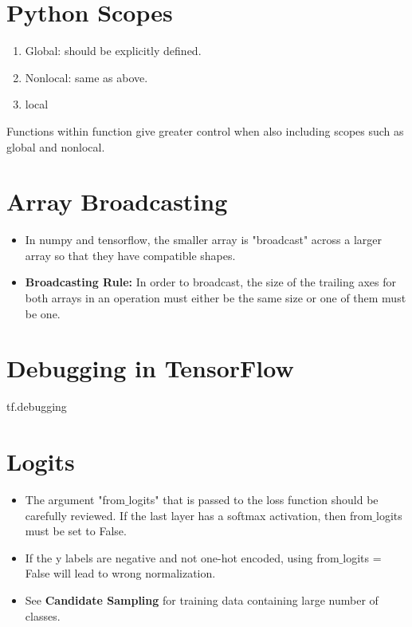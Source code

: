 \documentclass[11pt]{article}
\begin{document}
\begin{multicols*}{2}
\section{Python Scopes}
\begin{enumerate}
\item Global: should be explicitly defined.
\item Nonlocal: same as above.
\item local

\end{enumerate}

Functions within function give greater control when also including scopes such as global and nonlocal.

\section{Array Broadcasting}
\begin{itemize}
\item In numpy and tensorflow, the smaller array is "broadcast" across a larger array so that they have compatible shapes.
\item \textbf{Broadcasting Rule:} In order to broadcast, the size of the trailing axes for both arrays in an operation must either be the same size or one of them must be one.
\end{itemize}

\section{Debugging in TensorFlow}
tf.debugging

\section{Logits}
\begin{itemize}
\item The argument "from$\_$logits" that is passed to the loss function should be carefully reviewed. If the last layer has a softmax activation, then from$\_$logits must be set to False.
\item If the y labels are negative and not one-hot encoded, using from$\_$logits = False will lead to wrong normalization.
\item See \textbf{Candidate Sampling} for training data containing large number of classes.
\end{itemize}



\end{multicols*}
\end{document}
